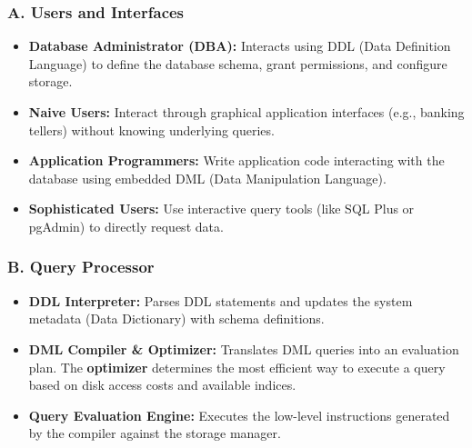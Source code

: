 \documentclass[12pt,a3paper]{article}
\begin{document}
\begin{enumerate}
\begin{tcolorbox}[enhanced,breakable,ansbox,colback=cA!4,colframe=cA,boxrule=0.8pt,arc=5pt,title={\textbf{Answer}},fonttitle=\bfseries\color{white},colbacktitle=cA]
\subsubsection*{A. Users and Interfaces}
\begin{itemize}
    \item \textbf{Database Administrator (DBA):} Interacts using DDL (Data Definition Language) to define the database schema, grant permissions, and configure storage.
    \item \textbf{Naive Users:} Interact through graphical application interfaces (e.g., banking tellers) without knowing underlying queries.
    \item \textbf{Application Programmers:} Write application code interacting with the database using embedded DML (Data Manipulation Language).
    \item \textbf{Sophisticated Users:} Use interactive query tools (like SQL Plus or pgAdmin) to directly request data.
\end{itemize}

\subsubsection*{B. Query Processor}
\begin{itemize}
    \item \textbf{DDL Interpreter:} Parses DDL statements and updates the system metadata (Data Dictionary) with schema definitions.
    \item \textbf{DML Compiler \& Optimizer:} Translates DML queries into an evaluation plan. The \textbf{optimizer} determines the most efficient way to execute a query based on disk access costs and available indices.
    \item \textbf{Query Evaluation Engine:} Executes the low-level instructions generated by the compiler against the storage manager.
\end{itemize}


\end{tcolorbox}
\end{enumerate}
\end{document}
